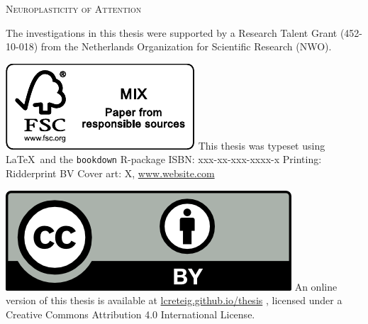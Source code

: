 
{\pagestyle{empty} 

\def\drop{.1\textheight}
\vspace*{\drop}
\begin{center}
\Huge \textsc{Neuroplasticity of Attention} %
\end{center}

\clearpage
\vspace*{\fill}
\begingroup %
\small
\setlength{\parskip}{\baselineskip} %
\setlength\parindent{0pt} %
The investigations in this thesis were supported by 
a Research Talent Grant (452-10-018)  %
from 
the Netherlands Organization for Scientific Research (NWO). %

\includegraphics{_bookdown_files/FSC.pdf} \newline
This thesis was typeset using \LaTeX\ and the \verb+bookdown+ R-package \newline
ISBN: xxx-xx-xxx-xxxx-x \newline %
Printing: Ridderprint BV \newline %
Cover art: X, \url{www.website.com} %

\includegraphics{_bookdown_files/CC-BY.png} \newline
An online version of this thesis is available at 
\url{lcreteig.github.io/thesis} %
, licensed under a 
Creative Commons Attribution 4.0 International License. %
\endgroup

}
